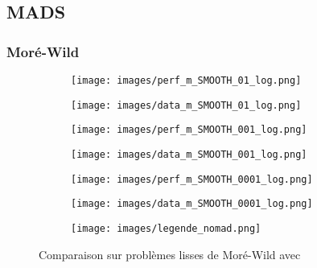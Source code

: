 	\subsection{MADS}
		\subsubsection{Moré-Wild}
			\begin{figure}[!htb] %
				\centering
				\begin{subfigure}{0.43\textwidth}
					\texttt{[image: images/perf\_m\_SMOOTH\_01\_log.png]}
				\end{subfigure}%
				\begin{subfigure}{0.43\textwidth}
					\texttt{[image: images/data\_m\_SMOOTH\_01\_log.png]}
				\end{subfigure}
				\smallskip
				\begin{subfigure}{0.43\textwidth}
					\texttt{[image: images/perf\_m\_SMOOTH\_001\_log.png]}
				\end{subfigure}%
				\begin{subfigure}{0.43\textwidth}
					\texttt{[image: images/data\_m\_SMOOTH\_001\_log.png]}
				\end{subfigure}
				\smallskip
				\begin{subfigure}{0.43\textwidth}
					\texttt{[image: images/perf\_m\_SMOOTH\_0001\_log.png]}
				\end{subfigure}%
				\begin{subfigure}{0.43\textwidth}
					\texttt{[image: images/data\_m\_SMOOTH\_0001\_log.png]}
				\end{subfigure}
				\smallskip
				\begin{subfigure}{0.95\textwidth}
					\texttt{[image: images/legende\_nomad.png]}
				\end{subfigure}
				\caption{Comparaison sur problèmes lisses de Moré-Wild avec \MADS} \label{fig:1}
			\end{figure}
			\clearpage
